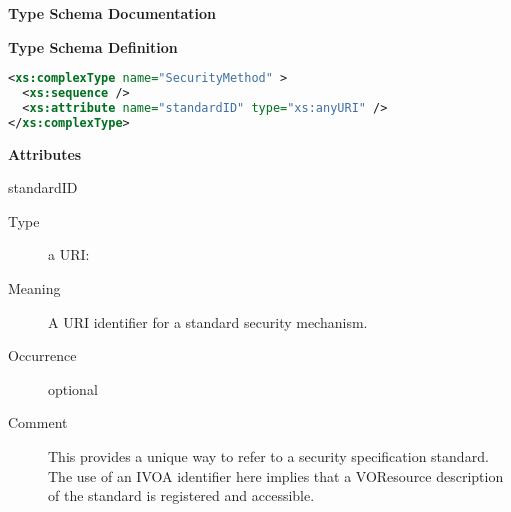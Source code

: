 \documentclass[11pt,a4paper]{ivoa}
\begin{document}
\begin{generated}
\begingroup
      	\renewcommand*\descriptionlabel[1]{%
      	\hbox to 5.5em{\emph{#1}\hfil}}\vspace{2ex}\noindent\textbf{ Type Schema Documentation}



\vspace{1ex}\noindent\textbf{ Type Schema Definition}

\begin{lstlisting}[language=XML,basicstyle=\footnotesize]
<xs:complexType name="SecurityMethod" >
  <xs:sequence />
  <xs:attribute name="standardID" type="xs:anyURI" />
</xs:complexType>
\end{lstlisting}

\vspace{0.5ex}\noindent\textbf{ Attributes}

\begingroup\small\begin{bigdescription}
\item[standardID]
\begin{description}
\item[Type] a URI: 
\item[Meaning] 
               A URI identifier for a standard security mechanism. 
            
\item[Occurrence] optional
\item[Comment] 
               This provides a unique way to refer to a security
               specification standard.  The use of an IVOA identifier here 
               implies that a VOResource description of the standard is 
               registered and accessible.  
            
\end{description}


\end{bigdescription}\endgroup

\endgroup
\end{generated}
\end{document}
